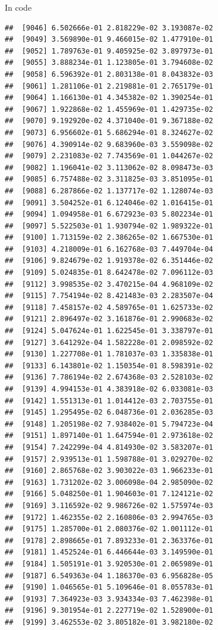 \documentclass[ignorenonframetext,]{beamer}
\begin{document}
\begin{frame}[fragile]{In code}
\begin{verbatim}
##  [9046] 6.502666e-01 2.818229e-02 3.193087e-02
##  [9049] 3.569890e-01 9.466015e-02 1.477910e-01
##  [9052] 1.789763e-01 9.405925e-02 3.897973e-01
##  [9055] 3.888234e-01 1.123805e-01 3.794608e-02
##  [9058] 6.596392e-01 2.803138e-01 8.043832e-03
##  [9061] 1.281106e-01 2.219881e-01 2.765179e-01
##  [9064] 1.166130e-01 4.345382e-02 1.390254e-01
##  [9067] 1.922868e-02 1.455969e-01 1.429735e-02
##  [9070] 9.192920e-02 4.371040e-01 9.367188e-02
##  [9073] 6.956602e-01 5.686294e-01 8.324627e-02
##  [9076] 4.390914e-02 9.683960e-03 3.559098e-02
##  [9079] 2.231083e-02 7.743569e-01 1.044267e-02
##  [9082] 1.196041e-02 3.113062e-02 8.098473e-03
##  [9085] 6.757488e-02 3.311825e-03 3.851095e-01
##  [9088] 6.287866e-02 1.137717e-02 1.128074e-03
##  [9091] 3.504252e-01 6.124046e-02 1.016415e-01
##  [9094] 1.094958e-01 6.672923e-03 5.802234e-01
##  [9097] 5.522503e-01 1.930794e-02 1.989322e-01
##  [9100] 1.713159e-02 2.386265e-02 1.667530e-01
##  [9103] 4.218009e-01 6.162768e-03 7.449704e-04
##  [9106] 9.824679e-02 1.919378e-02 6.351446e-02
##  [9109] 5.024835e-01 8.642478e-02 7.096112e-03
##  [9112] 3.998535e-02 3.470215e-04 4.968109e-02
##  [9115] 7.754194e-02 8.421483e-03 2.283507e-04
##  [9118] 7.458157e-02 4.589765e-01 1.625733e-02
##  [9121] 2.896497e-02 3.161876e-01 2.990683e-02
##  [9124] 5.047624e-01 1.622545e-01 3.338797e-01
##  [9127] 3.641292e-04 1.582228e-01 2.098592e-02
##  [9130] 1.227708e-01 1.781037e-03 1.335838e-01
##  [9133] 6.143801e-02 1.150354e-01 8.598391e-02
##  [9136] 7.786194e-02 2.674368e-03 2.528103e-02
##  [9139] 4.994153e-01 4.383918e-02 6.033081e-03
##  [9142] 1.551313e-01 1.014412e-03 2.703755e-01
##  [9145] 1.295495e-02 6.048736e-01 2.036285e-03
##  [9148] 1.205198e-02 7.938402e-01 5.794723e-04
##  [9151] 1.897140e-01 1.647594e-01 2.973618e-02
##  [9154] 7.242299e-04 4.814930e-02 3.583207e-01
##  [9157] 2.939513e-01 1.598788e-01 3.029270e-02
##  [9160] 2.865768e-02 3.903022e-03 1.966233e-01
##  [9163] 1.731202e-02 3.006098e-04 2.985090e-02
##  [9166] 5.048250e-01 1.904603e-01 7.124121e-02
##  [9169] 3.116592e-02 9.986726e-02 1.575974e-03
##  [9172] 1.462355e-02 2.160806e-03 2.994765e-03
##  [9175] 1.285700e-01 2.080376e-02 1.001112e-01
##  [9178] 2.898665e-01 7.893233e-01 2.363376e-01
##  [9181] 1.452524e-01 6.446644e-03 3.149590e-01
##  [9184] 1.505191e-01 3.920530e-01 2.065989e-01
##  [9187] 6.549363e-04 1.186370e-03 6.956828e-05
##  [9190] 1.046565e-01 5.109646e-01 8.055783e-01
##  [9193] 7.364923e-03 3.934334e-03 7.462398e-01
##  [9196] 9.301954e-01 2.227719e-02 1.528900e-01
##  [9199] 3.462553e-02 3.805182e-01 3.982180e-02

\end{verbatim}
\end{frame}
\end{document}
